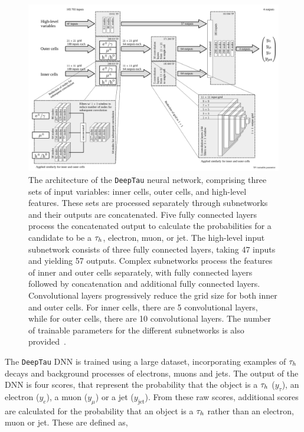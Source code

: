 \begin{figure}[p!]
\centering
    \includegraphics[width=\textwidth]{Figures/deeptau.pdf}
\caption[Diagram of the architecture of the \texttt{DeepTau} neural network.]{The architecture of the \texttt{DeepTau} neural network, comprising three sets of input variables: inner cells, outer cells, and high-level features. These sets are processed separately through subnetworks and their outputs are concatenated. Five fully connected layers process the concatenated output to calculate the probabilities for a candidate to be a $\tau_{h}$, electron, muon, or jet. The high-level input subnetwork consists of three fully connected layers, taking 47 inputs and yielding 57 outputs. Complex subnetworks process the features of inner and outer cells separately, with fully connected layers followed by concatenation and additional fully connected layers. Convolutional layers progressively reduce the grid size for both inner and outer cells. For inner cells, there are 5 convolutional layers, while for outer cells, there are 10 convolutional layers. The number of trainable parameters for the different subnetworks is also provided~\cite{CMS:2022prd}.}
\label{fig:deeptau}
\end{figure}


The \texttt{DeepTau} \ac{DNN} is trained using a large dataset, incorporating examples of $\tau_{h}$ decays and background processes of electrons, muons and jets. 
The output of the \ac{DNN} is four scores, that represent the probability that the object is a $\tau_{h}$ ($y_\tau$), an electron ($y_e$), a muon ($y_\mu$) or a jet ($y_{\text{jet}}$).
From these raw scores, additional scores are calculated for the probability that an object is a $\tau_{h}$ rather than an electron, muon or jet.
These are defined as,

